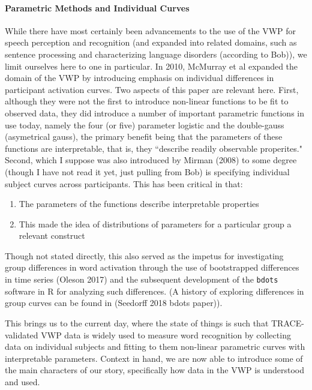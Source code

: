 \documentclass{article}
\newcommand{\xt}{\texttt}%
\begin{document}
\paragraph{Parametric Methods and Individual Curves} While there have most certainly been advancements to the use of the VWP for speech perception and recognition (and expanded into related domains, such as sentence processing and characterizing language disorders (according to Bob)), we  limit ourselves here to one in particular. In 2010, McMurray et al expanded the domain of the VWP by introducing emphasis on individual differences in participant activation curves. Two aspects of this paper are relevant here. First, although they were not the first to introduce non-linear functions to be fit to observed data, they did introduce a number of important parametric functions in use today, namely the four (or five) parameter logistic and the double-gauss (asymetrical gauss), the primary benefit being that the parameters of these functions are interpretable, that is, they ``describe readily observable properites." Second, which I suppose was also introduced by Mirman (2008) to some degree (though I have not read it yet, just pulling from Bob) is specifying individual subject curves across participants. This has been critical in that:

\begin{singlespace}
\begin{enumerate}
\vspace{-3mm}
\item The parameters of the functions describe interpretable properties
\item This made the idea of distributions of parameters for a particular group a relevant construct
\end{enumerate}
\end{singlespace}

Though not stated directly, this also served as the impetus for investigating group differences in word activation through the use of bootstrapped differences in time series (Oleson 2017) and the subsequent development of the \xt{bdots} software in R for analyzing such differences. (A history of exploring differences in group curves can be found in (Seedorff 2018 bdots paper)).

This brings us to the current day, where the state of things is such that TRACE-validated VWP data is widely used to measure word recognition by collecting data on individual subjects and fitting to them non-linear parametric curves with interpretable parameters. Context in hand, we are now able to introduce some of the main characters of our story, specifically how data in the VWP is understood and used. 
\end{document}
